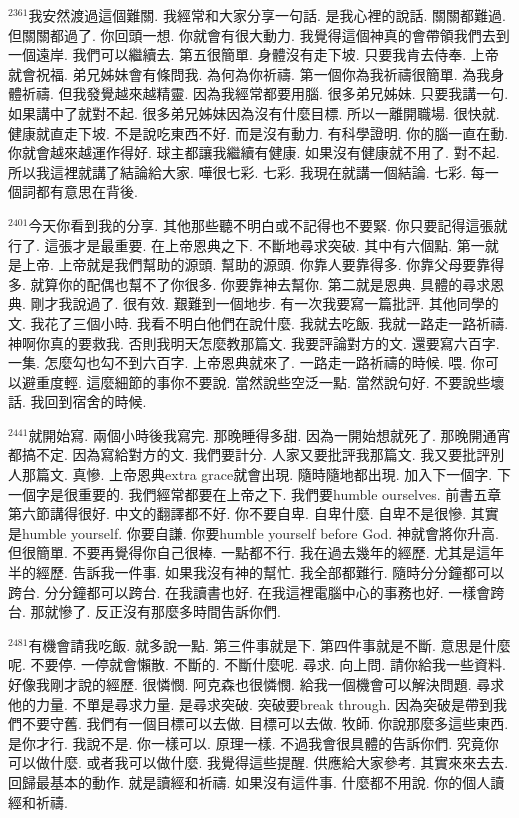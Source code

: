 \documentclass{book}
\begin{document}
$^{2361}$我安然渡過這個難關.
我經常和大家分享一句話.
是我心裡的說話.
關關都難過.
但關關都過了.
你回頭一想.
你就會有很大動力.
我覺得這個神真的會帶領我們去到一個遠岸.
我們可以繼續去.
第五很簡單.
身體沒有走下坡.
只要我肯去侍奉.
上帝就會祝福.
弟兄姊妹會有條問我.
為何為你祈禱.
第一個你為我祈禱很簡單.
為我身體祈禱.
但我發覺越來越精靈.
因為我經常都要用腦.
很多弟兄姊妹.
只要我講一句.
如果講中了就對不起.
很多弟兄姊妹因為沒有什麼目標.
所以一離開職場.
很快就.
健康就直走下坡.
不是說吃東西不好.
而是沒有動力.
有科學證明.
你的腦一直在動.
你就會越來越運作得好.
球主都讓我繼續有健康.
如果沒有健康就不用了.
對不起.
所以我這裡就講了結論給大家.
嘩很七彩.
七彩.
我現在就講一個結論.
七彩.
每一個詞都有意思在背後.

$^{2401}$今天你看到我的分享.
其他那些聽不明白或不記得也不要緊.
你只要記得這張就行了.
這張才是最重要.
在上帝恩典之下.
不斷地尋求突破.
其中有六個點.
第一就是上帝.
上帝就是我們幫助的源頭.
幫助的源頭.
你靠人要靠得多.
你靠父母要靠得多.
就算你的配偶也幫不了你很多.
你要靠神去幫你.
第二就是恩典.
具體的尋求恩典.
剛才我說過了.
很有效.
艱難到一個地步.
有一次我要寫一篇批評.
其他同學的文.
我花了三個小時.
我看不明白他們在說什麼.
我就去吃飯.
我就一路走一路祈禱.
神啊你真的要救我.
否則我明天怎麼教那篇文.
我要評論對方的文.
還要寫六百字.
一集.
怎麼勾也勾不到六百字.
上帝恩典就來了.
一路走一路祈禱的時候.
喂.
你可以避重度輕.
這麼細節的事你不要說.
當然說些空泛一點.
當然說句好.
不要說些壞話.
我回到宿舍的時候.

$^{2441}$就開始寫.
兩個小時後我寫完.
那晚睡得多甜.
因為一開始想就死了.
那晚開通宵都搞不定.
因為寫給對方的文.
我們要計分.
人家又要批評我那篇文.
我又要批評別人那篇文.
真慘.
上帝恩典extra grace就會出現.
隨時隨地都出現.
加入下一個字.
下一個字是很重要的.
我們經常都要在上帝之下.
我們要humble ourselves.
前書五章第六節講得很好.
中文的翻譯都不好.
你不要自卑.
自卑什麼.
自卑不是很慘.
其實是humble yourself.
你要自謙.
你要humble yourself before God.
神就會將你升高.
但很簡單.
不要再覺得你自己很棒.
一點都不行.
我在過去幾年的經歷.
尤其是這年半的經歷.
告訴我一件事.
如果我沒有神的幫忙.
我全部都難行.
隨時分分鐘都可以跨台.
分分鐘都可以跨台.
在我讀書也好.
在我這裡電腦中心的事務也好.
一樣會跨台.
那就慘了.
反正沒有那麼多時間告訴你們.

$^{2481}$有機會請我吃飯.
就多說一點.
第三件事就是下.
第四件事就是不斷.
意思是什麼呢.
不要停.
一停就會懶散.
不斷的.
不斷什麼呢.
尋求.
向上問.
請你給我一些資料.
好像我剛才說的經歷.
很憐憫.
阿克森也很憐憫.
給我一個機會可以解決問題.
尋求他的力量.
不單是尋求力量.
是尋求突破.
突破要break through.
因為突破是帶到我們不要守舊.
我們有一個目標可以去做.
目標可以去做.
牧師.
你說那麼多這些東西.
是你才行.
我說不是.
你一樣可以.
原理一樣.
不過我會很具體的告訴你們.
究竟你可以做什麼.
或者我可以做什麼.
我覺得這些提醒.
供應給大家參考.
其實來來去去.
回歸最基本的動作.
就是讀經和祈禱.
如果沒有這件事.
什麼都不用說.
你的個人讀經和祈禱.
\end{document}

